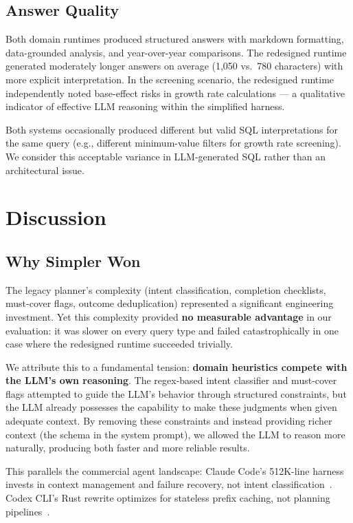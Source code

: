 \documentclass{article}
\begin{document}
\subsection{Answer Quality}

Both domain runtimes produced structured answers with markdown formatting, data-grounded analysis, and year-over-year comparisons.
The redesigned runtime generated moderately longer answers on average (1,050 vs.\ 780 characters) with more explicit interpretation.
In the screening scenario, the redesigned runtime independently noted base-effect risks in growth rate calculations --- a qualitative indicator of effective LLM reasoning within the simplified harness.

Both systems occasionally produced different but valid SQL interpretations for the same query (e.g., different minimum-value filters for growth rate screening). We consider this acceptable variance in LLM-generated SQL rather than an architectural issue.

\section{Discussion}

\subsection{Why Simpler Won}

The legacy planner's complexity (intent classification, completion checklists, must-cover flags, outcome deduplication) represented a significant engineering investment.
Yet this complexity provided \textbf{no measurable advantage} in our evaluation: it was slower on every query type and failed catastrophically in one case where the redesigned runtime succeeded trivially.

We attribute this to a fundamental tension: \textbf{domain heuristics compete with the LLM's own reasoning}.
The regex-based intent classifier and must-cover flags attempted to guide the LLM's behavior through structured constraints, but the LLM already possesses the capability to make these judgments when given adequate context.
By removing these constraints and instead providing richer context (the schema in the system prompt), we allowed the LLM to reason more naturally, producing both faster and more reliable results.

This parallels the commercial agent landscape: Claude Code's 512K-line harness invests in context management and failure recovery, not intent classification~\cite{claudecodeleak2026}. Codex CLI's Rust rewrite optimizes for stateless prefix caching, not planning pipelines~\cite{codexloop2025,pragmaticcodex2025}.
\end{document}
